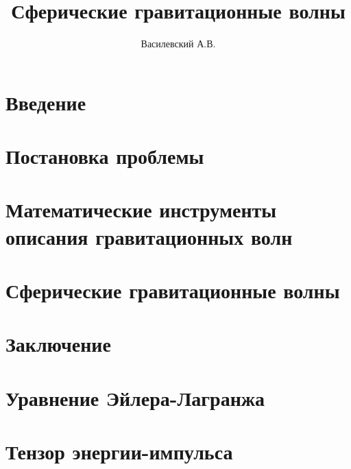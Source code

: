 \documentclass[12pt,a4paper]{article}
\title{Сферические гравитационные волны}
\author{Василевский А.В.}
\providecommand{\docroot}{../..}
\begin{document}
    \makedocroot

    \maketitle
    \tableofcontents

    \section{Введение}
    

    \section{Постановка проблемы}
    

    \section{Математические инструменты описания гравитационных волн}
    

    \section{Сферические гравитационные волны}
    

    \section{Заключение}
    

    \begin{appendix}

        \section{Уравнение Эйлера-Лагранжа}
        

        \section{Тензор энергии-импульса}
        

    \end{appendix}

    \todototoc\listoftodos

    \clearpage

    
    
\end{document}
